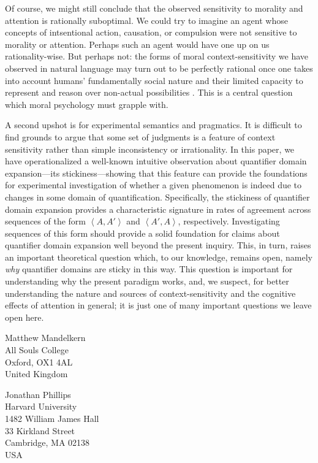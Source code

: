 \documentclass{salt}
\newcommand{\seq}[1]{\left\langle {#1} \right\rangle}
\begin{document}
Of course, we might still conclude that the observed sensitivity to morality and attention is rationally suboptimal. We could try to imagine an agent whose concepts of intsentional action, causation, or compulsion were not sensitive to morality or attention. Perhaps such an agent would have one up on us rationality-wise. But perhaps not: the forms of moral context-sensitivity we have observed in natural language may turn out to be perfectly rational once one takes into account humans' fundamentally social nature and their limited capacity to represent and reason over non-actual possibilities \citep{phillips2018psychological,Phillips2017morality,Shtulman2018}. This is a central question which moral psychology must grapple with.

A second upshot is for experimental semantics and pragmatics. It is difficult to find grounds to argue that some set of judgments is a feature of context sensitivity rather than simple inconsistency or irrationality. In this paper, we have operationalized a well-known intuitive observation about quantifier domain expansion---its stickiness---showing that this feature can provide the foundations for experimental investigation of whether a given phenomenon is indeed due to changes in some domain of quantification. Specifically, the stickiness of quantifier domain expansion provides a characteristic signature in rates of agreement across sequences of the form $\seq{A,A'}$ and $\seq{A',A}$, respectively. Investigating sequences of this form should provide a solid foundation for claims about quantifier domain expansion well beyond the present inquiry. This, in turn, raises an important theoretical question which, to our knowledge, remains open, namely \emph{why} quantifier domains are sticky in this way. This question is important for understanding why the present paradigm works, and, we suspect, for better understanding the nature and sources of context-sensitivity and the cognitive effects of attention in general; it is just one of many important questions we leave open here.


   


\begin{addresses}
  \begin{address}
    Matthew Mandelkern \\
    All Souls College\\
    Oxford, OX1 4AL\\
    United Kingdom\\
  \end{address}

  \begin{address}
   Jonathan Phillips \\
  	Harvard University\\
    1482 William James Hall \\
    33 Kirkland Street \\
    Cambridge, MA 02138\\
    USA \\
  \end{address}
\end{addresses}
\end{document}
